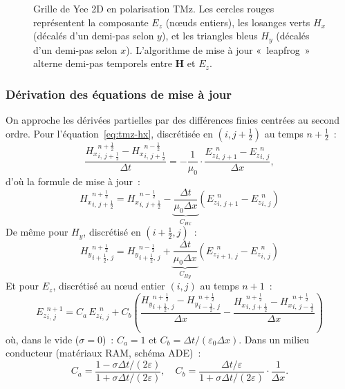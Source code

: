 \documentclass[12pt,a4paper]{article}
\newcommand{\vH}{\bm{H}}
\newcommand{\Ez}{{E_z}}
\newcommand{\Hx}{{H_x}}
\newcommand{\Hy}{{H_y}}
\newcommand{\eps}{\varepsilon}
\newcommand{\muo}{\mu_0}
\newcommand{\epso}{\varepsilon_0}
\newcommand{\dx}{\Delta x}
\newcommand{\dt}{\Delta t}
\newcommand{\half}{\tfrac{1}{2}}
\begin{document}
\begin{figure}[htbp]
\caption{Grille de Yee 2D en polarisation TMz. Les cercles rouges représentent
la composante $\Ez$ (n\oe uds entiers), les losanges verts $\Hx$ (décalés d'un
demi-pas selon $y$), et les triangles bleus $\Hy$ (décalés d'un demi-pas selon $x$).
L'algorithme de mise à jour «~leapfrog~» alterne demi-pas temporels entre $\vH$
et $\Ez$.}
\label{fig:yee-grid}
\end{figure}

\subsubsection{Dérivation des équations de mise à jour}

On approche les dérivées partielles par des différences finies centrées au second
ordre. Pour l'équation~\eqref{eq:tmz-hx}, discrétisée en $(i, j+\half)$ au temps
$n+\half$~:
\begin{equation}
    \frac{\Hx^{n+\half}_{i,\,j+\half} - \Hx^{n-\half}_{i,\,j+\half}}{\dt}
    = -\frac{1}{\muo} \cdot
    \frac{\Ez^n_{i,\,j+1} - \Ez^n_{i,\,j}}{\dx},
    \label{eq:disc-hx-raw}
\end{equation}
d'où la formule de mise à jour~:
\begin{equation}
    \boxed{
    \Hx^{n+\half}_{i,\,j+\half} = \Hx^{n-\half}_{i,\,j+\half}
    - \underbrace{\frac{\dt}{\muo\dx}}_{C_{Hx}}\!\!
    \left(\Ez^n_{i,\,j+1} - \Ez^n_{i,\,j}\right)}
    \label{eq:yee-hx}
\end{equation}
De même pour $\Hy$, discrétisé en $(i+\half, j)$~:
\begin{equation}
    \boxed{
    \Hy^{n+\half}_{i+\half,\,j} = \Hy^{n-\half}_{i+\half,\,j}
    + \underbrace{\frac{\dt}{\muo\dx}}_{C_{Hy}}\!\!
    \left(\Ez^n_{i+1,\,j} - \Ez^n_{i,\,j}\right)}
    \label{eq:yee-hy}
\end{equation}
Et pour $\Ez$, discrétisé au n\oe ud entier $(i,j)$ au temps $n+1$~:
\begin{equation}
    \boxed{
    \Ez^{n+1}_{i,\,j} = C_a\,\Ez^n_{i,\,j}
    + C_b \left(
    \frac{\Hy^{n+\half}_{i+\half,\,j} - \Hy^{n+\half}_{i-\half,\,j}}{\dx}
    - \frac{\Hx^{n+\half}_{i,\,j+\half} - \Hx^{n+\half}_{i,\,j-\half}}{\dx}
    \right)}
    \label{eq:yee-ez}
\end{equation}
où, dans le vide ($\sigma = 0$)~: $C_a = 1$ et $C_b = \dt/(\epso\dx)$.
Dans un milieu conducteur (matériaux RAM, schéma ADE)~:
\begin{equation}
    C_a = \frac{1 - \sigma\dt/(2\eps)}{1 + \sigma\dt/(2\eps)}, \quad
    C_b = \frac{\dt/\eps}{1 + \sigma\dt/(2\eps)} \cdot \frac{1}{\dx}.
    \label{eq:yee-ca-cb}
\end{equation}
\end{document}
